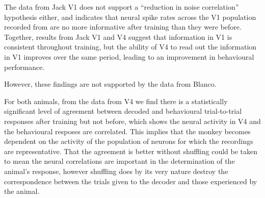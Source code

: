 The data from Jack V1 does not support a ``reduction in noise correlation'' hypothesis either, and indicates that neural spike rates across the V1 population recorded from are no more informative after training than they were before. Together, results from Jack V1 and V4 suggest that information in V1 is consistent throughout training, but the ability of V4 to read out the information in V1 improves over the same period, leading to an improvement in behavioural performance.

However, these findings are not supported by the data from Blanco.


For both animals, from the data from V4 we find there is a statistically significant level of agreement between decoded and behavioural trial-to-trial responses after training but not before, which shows the neural activity in V4 and the behavioural resposes are correlated. This implies that the monkey becomes dependent on the activity of the population of neurons for which the recordings are representative. That the agreement is better without shuffling could be taken to mean the neural correlations are important in the determination of the animal's response, however shuffling does by its very nature destroy the correspondence between the trials given to the decoder and those experienced by the animal.


